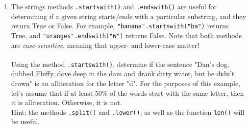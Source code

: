 \documentclass{article}[12pt]
\newcommand{\code}[1]{\texttt{#1}}  %
\begin{document}
\begin{enumerate}[itemsep=5ex]
	\item The strings methods \code{.startswith()} and \code{.endswith()} are useful for determining if a given string starts/ends with a particular substring, and they return True or False. For example, \code{"banana".startswith("ba")} returns True, and \code{"oranges".endswith("W")} returns False. Note that both methods are \emph{case-sensitive}, meaning that upper- and lower-case matter! \\\\ Using the method \code{.startswith()}, determine if the sentence "Dan's dog, dubbed Fluffy, dove deep in the dam and drank dirty water, but he didn't drown" is an alliteration for the letter "d". For the purposes of this example, let's assume that if at least 50\% of the words start with the same letter, then it is alliteration. Otherwise, it is not. 
	\\ Hint: the methods \code{.split()} and \code{.lower()}, as well as the function \code{len()} will be useful.


\end{enumerate}
\end{document}

